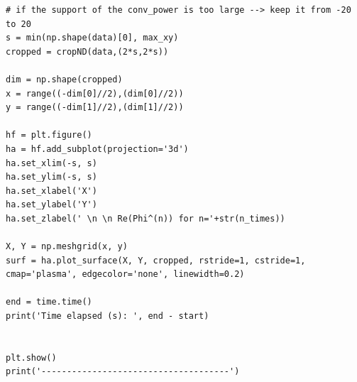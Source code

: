 \documentclass{article}
\theoremstyle{definition}
\begin{document}
\begin{lstlisting}
# if the support of the conv_power is too large --> keep it from -20 to 20
s = min(np.shape(data)[0], max_xy)
cropped = cropND(data,(2*s,2*s))

dim = np.shape(cropped)
x = range((-dim[0]//2),(dim[0]//2))
y = range((-dim[1]//2),(dim[1]//2))

hf = plt.figure()
ha = hf.add_subplot(projection='3d')
ha.set_xlim(-s, s)
ha.set_ylim(-s, s)
ha.set_xlabel('X')
ha.set_ylabel('Y')
ha.set_zlabel(' \n \n Re(Phi^(n)) for n='+str(n_times))

X, Y = np.meshgrid(x, y)  
surf = ha.plot_surface(X, Y, cropped, rstride=1, cstride=1, cmap='plasma', edgecolor='none', linewidth=0.2)

end = time.time()
print('Time elapsed (s): ', end - start)


plt.show()
print('-------------------------------------')

\end{lstlisting} 	
	
\end{document}
